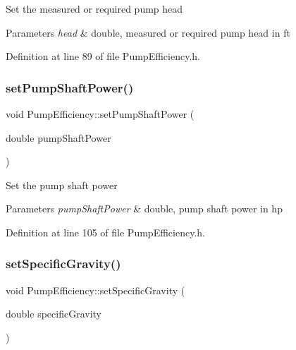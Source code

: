 Set the measured or required pump head 
\begin{DoxyParams}{Parameters}
{\em head} & double, measured or required pump head in ft \\
\hline
\end{DoxyParams}


Definition at line 89 of file Pump\+Efficiency.\+h.

\mbox{\label{class_pump_efficiency_ad3c2e64a590528b54e3878f9d1f3223a}} 
\subsubsection{\texorpdfstring{set\+Pump\+Shaft\+Power()}{setPumpShaftPower()}}
{\footnotesize\ttfamily void Pump\+Efficiency\+::set\+Pump\+Shaft\+Power (\begin{DoxyParamCaption}\item[{double}]{pump\+Shaft\+Power }\end{DoxyParamCaption})\hspace{0.3cm}{\ttfamily [inline]}}

Set the pump shaft power 
\begin{DoxyParams}{Parameters}
{\em pump\+Shaft\+Power} & double, pump shaft power in hp \\
\hline
\end{DoxyParams}


Definition at line 105 of file Pump\+Efficiency.\+h.

\mbox{\label{class_pump_efficiency_afc8b3ecd0fe1a356c82042aa0fc84024}} 
\subsubsection{\texorpdfstring{set\+Specific\+Gravity()}{setSpecificGravity()}}
{\footnotesize\ttfamily void Pump\+Efficiency\+::set\+Specific\+Gravity (\begin{DoxyParamCaption}\item[{double}]{specific\+Gravity }\end{DoxyParamCaption})\hspace{0.3cm}{\ttfamily [inline]}}

